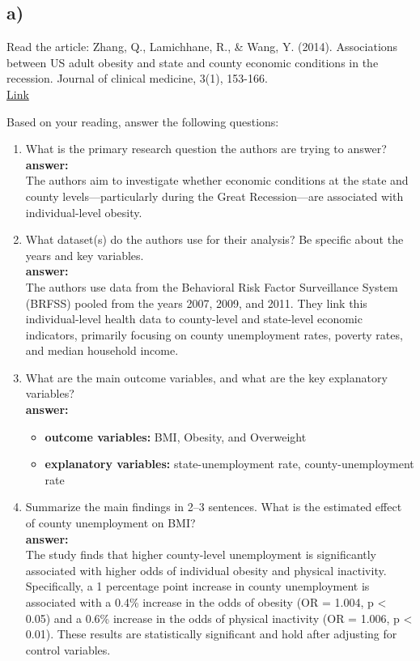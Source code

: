 \documentclass[12pt]{article}
\begin{document}
\subsection*{a)}

Read the article: Zhang, Q., Lamichhane, R., \& Wang, Y. (2014). Associations between US adult obesity and state and county economic conditions in the recession. Journal of clinical medicine, 3(1), 153-166.\\
\href{https://pmc.ncbi.nlm.nih.gov/articles/PMC4449673/}{Link}

\vspace{0.3cm}

Based on your reading, answer the following questions:

\begin{enumerate}
    \item What is the primary research question the authors are trying to answer?\\
    \textbf{answer:}\\
    The authors aim to investigate whether economic conditions at the state and county levels—particularly during the Great Recession—are associated with individual-level obesity.
    \item What dataset(s) do the authors use for their analysis? Be specific about the years and key variables.\\
    \textbf{answer:}\\
    The authors use data from the Behavioral Risk Factor Surveillance System (BRFSS) pooled from the years 2007, 2009, and 2011. They link this individual-level health data to county-level and state-level economic indicators, primarily focusing on county unemployment rates, poverty rates, and median household income. 
    
    \item What are the main outcome variables, and what are the key explanatory variables?\\
    \textbf{answer:}\\
    \begin{itemize}
      \item \textbf{outcome variables:} BMI, Obesity, and Overweight
      \item \textbf{explanatory variables:} state-unemployment rate, county-unemployment rate
    \end{itemize}
    
    \item Summarize the main findings in 2--3 sentences. What is the estimated effect of county unemployment on BMI?\\
    \textbf{answer:}\\
    The study finds that higher county-level unemployment is significantly associated with higher odds of individual obesity and physical inactivity. Specifically, a 1 percentage point increase in county unemployment is associated with a 0.4\% increase in the odds of obesity (OR = 1.004, p < 0.05) and a 0.6\% increase in the odds of physical inactivity (OR = 1.006, p < 0.01). These results are statistically significant and hold after adjusting for control variables.

\end{enumerate}
\end{document}
